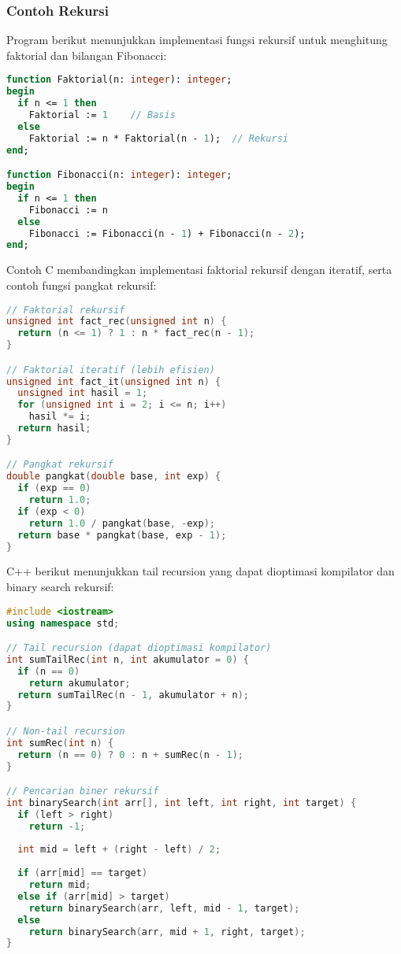 \documentclass[../main.tex]{subfiles}
\begin{document}
\subsubsection{Contoh Rekursi}

Program berikut menunjukkan implementasi fungsi rekursif untuk menghitung faktorial dan bilangan Fibonacci:

\begin{lstlisting}[language=Pascal, caption={Fungsi rekursif (Pascal)}]
function Faktorial(n: integer): integer;
begin
  if n <= 1 then
    Faktorial := 1    // Basis
  else
    Faktorial := n * Faktorial(n - 1);  // Rekursi
end;

function Fibonacci(n: integer): integer;
begin
  if n <= 1 then
    Fibonacci := n
  else
    Fibonacci := Fibonacci(n - 1) + Fibonacci(n - 2);
end;
\end{lstlisting}

Contoh C membandingkan implementasi faktorial rekursif dengan iteratif, serta contoh fungsi pangkat rekursif:

\begin{lstlisting}[language=C, caption={Fungsi rekursif vs iteratif (C)}]
// Faktorial rekursif
unsigned int fact_rec(unsigned int n) {
  return (n <= 1) ? 1 : n * fact_rec(n - 1);
}

// Faktorial iteratif (lebih efisien)
unsigned int fact_it(unsigned int n) {
  unsigned int hasil = 1;
  for (unsigned int i = 2; i <= n; i++)
    hasil *= i;
  return hasil;
}

// Pangkat rekursif
double pangkat(double base, int exp) {
  if (exp == 0)
    return 1.0;
  if (exp < 0)
    return 1.0 / pangkat(base, -exp);
  return base * pangkat(base, exp - 1);
}
\end{lstlisting}

C++ berikut menunjukkan tail recursion yang dapat dioptimasi kompilator dan binary search rekursif:

\begin{lstlisting}[language=C++, caption={Rekursi dengan optimasi (C++)}]
#include <iostream>
using namespace std;

// Tail recursion (dapat dioptimasi kompilator)
int sumTailRec(int n, int akumulator = 0) {
  if (n == 0)
    return akumulator;
  return sumTailRec(n - 1, akumulator + n);
}

// Non-tail recursion
int sumRec(int n) {
  return (n == 0) ? 0 : n + sumRec(n - 1);
}

// Pencarian biner rekursif
int binarySearch(int arr[], int left, int right, int target) {
  if (left > right)
    return -1;
  
  int mid = left + (right - left) / 2;
  
  if (arr[mid] == target)
    return mid;
  else if (arr[mid] > target)
    return binarySearch(arr, left, mid - 1, target);
  else
    return binarySearch(arr, mid + 1, right, target);
}
\end{lstlisting}
\end{document}
